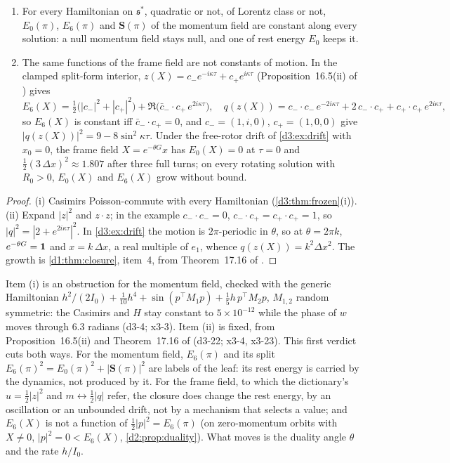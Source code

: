 \begin{corollary}
\label{d3:cor:nogen}
\begin{enumerate}[label=(\roman*),leftmargin=2.2em]
\item For every Hamiltonian on $\mathfrak s^*$, quadratic or not, of Lorentz class or not, $E_0(\pi)$, $E_6(\pi)$ and $\mathbf S(\pi)$ of the momentum
field are constant along every solution: a null momentum field stays null, and one of rest energy $E_0$ keeps it.
\item The same functions of the frame field are not constants of motion. In the clamped split-form interior, $z(X)=c_-e^{-i\kappa\tau}+c_+e^{i\kappa\tau}$
(Proposition~16.5(ii) of \cite{ES17}) gives
\[
E_6(X)=\tfrac12\bigl(|c_-|^2+|c_+|^2\bigr)+\Re\bigl(\bar c_-\!\cdot c_+\,e^{2i\kappa\tau}\bigr),\quad
q(z(X))=c_-\!\cdot c_-\,e^{-2i\kappa\tau}+2\,c_-\!\cdot c_++c_+\!\cdot c_+\,e^{2i\kappa\tau},
\]
so $E_6(X)$ is constant iff $\bar c_-\!\cdot c_+=0$, and $c_-=(1,i,0)$, $c_+=(1,0,0)$ give $|q(z(X))|^2=9-8\sin^2\kappa\tau$. Under the free-rotor drift of
\cref{d3:ex:drift} with $x_0=0$, the frame field $X=e^{-\theta G}x$ has $E_0(X)=0$ at $\tau=0$ and $\tfrac12(3\,\Delta x)^2\approx1.807$ after three full
turns; on every rotating solution with $R_0>0$, $E_0(X)$ and $E_6(X)$ grow without bound.
\end{enumerate}
\end{corollary}

\begin{proof}
(i) Casimirs Poisson-commute with every Hamiltonian (\cref{d3:thm:frozen}(i)). (ii) Expand $|z|^2$ and $z\cdot z$; in the example $c_-\cdot c_-=0$,
$c_-\cdot c_+=c_+\cdot c_+=1$, so $|q|^2=|2+e^{2i\kappa\tau}|^2$. In \cref{d3:ex:drift} the motion is $2\pi$-periodic in $\theta$, so at $\theta=2\pi k$,
$e^{-\theta G}=\mathbf 1$ and $x=k\,\Delta x$, a real multiple of $e_1$, whence $q(z(X))=k^2\Delta x^2$. The growth is \cref{d1:thm:closure}, item~4, from
Theorem~17.16 of \cite{ES17}.
\end{proof}

Item (i) is an obstruction for the momentum field, checked with the generic Hamiltonian
$h^2/(2I_0)+\tfrac1{10}h^4+\sin(p^{\!\top}M_1p)+\tfrac15h\,p^{\!\top}M_2p$, $M_{1,2}$ random symmetric: the Casimirs and $H$ stay constant to
$5\times10^{-12}$ while the phase of $w$ moves through $6.3$ radians (d3-4; x3-3). Item (ii) is fixed, from Proposition~16.5(ii) and Theorem~17.16 of
\cite{ES17} (d3-22; x3-4, x3-23). This first verdict cuts both ways. For the momentum field, $E_6(\pi)$ and its split
$E_6(\pi)^2=E_0(\pi)^2+|\mathbf S(\pi)|^2$ are labels of the leaf: its rest energy is carried by the dynamics, not produced by it. For the frame
field, to which the dictionary's $u=\tfrac12|z|^2$ and $m\leftrightarrow\tfrac12|q|$ refer, the closure does change the rest energy, by an
oscillation or an unbounded drift, not by a mechanism that selects a value; and $E_6(X)$ is not a function of $\tfrac12|p|^2=E_6(\pi)$ (on
zero-momentum orbits with $X\neq0$, $|p|^2=0<E_6(X)$, \cref{d2:prop:duality}). What moves is the duality angle $\theta$ and the rate $h/I_0$.


